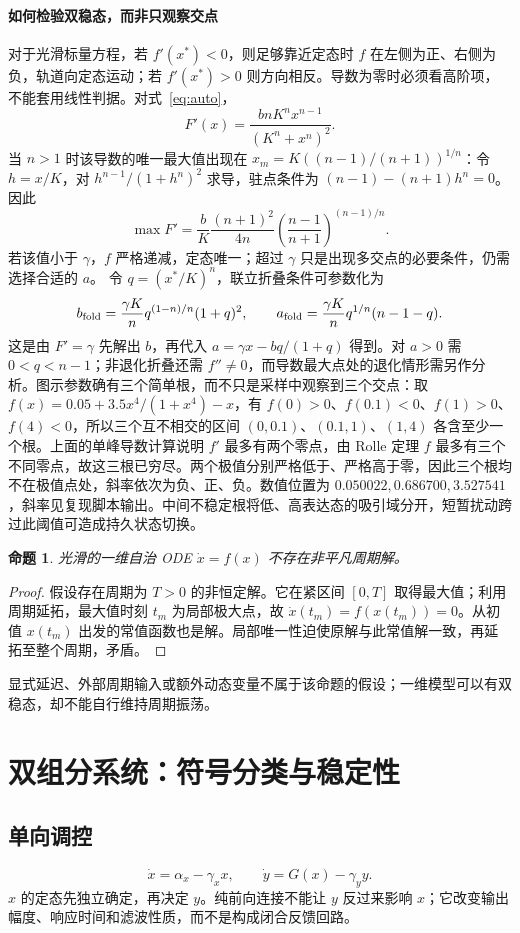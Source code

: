 \documentclass[11pt,a4paper,UTF8,fontset=fandol]{ctexart}
\newtheorem{proposition}{命题}[section]
\begin{document}
\paragraph{如何检验双稳态，而非只观察交点}
对于光滑标量方程，若 $f'(x^*)<0$，则足够靠近定态时 $f$ 在左侧为正、右侧为负，轨道向定态运动；若 $f'(x^*)>0$ 则方向相反。导数为零时必须看高阶项，不能套用线性判据。对式~\eqref{eq:auto}，
\[
F'(x)=\frac{bnK^nx^{n-1}}{(K^n+x^n)^2}.
\]
当 $n>1$ 时该导数的唯一最大值出现在 $x_m=K((n-1)/(n+1))^{1/n}$：令 $h=x/K$，对 $h^{n-1}/(1+h^n)^2$ 求导，驻点条件为 $(n-1)-(n+1)h^n=0$。因此
\[
\max F'=\frac bK\frac{(n+1)^2}{4n}
\left(\frac{n-1}{n+1}\right)^{(n-1)/n}.
\]
若该值小于 $\gamma$，$f$ 严格递减，定态唯一；超过 $\gamma$ 只是出现多交点的必要条件，仍需选择合适的 $a$。
令 $q=(x^*/K)^n$，联立折叠条件可参数化为
\[
b_{\rm fold}=\frac{\gamma K}{n}q^{(1-n)/n}(1+q)^2,\qquad
a_{\rm fold}=\frac{\gamma K}{n}q^{1/n}(n-1-q).
\]
这是由 $F'=\gamma$ 先解出 $b$，再代入 $a=\gamma x-bq/(1+q)$ 得到。对 $a>0$ 需 $0<q<n-1$；非退化折叠还需 $f''\ne0$，而导数最大点处的退化情形需另作分析。图示参数确有三个简单根，而不只是采样中观察到三个交点：取 $f(x)=0.05+3.5x^4/(1+x^4)-x$，有 $f(0)>0$、$f(0.1)<0$、$f(1)>0$、$f(4)<0$，所以三个互不相交的区间 $(0,0.1)$、$(0.1,1)$、$(1,4)$ 各含至少一个根。上面的单峰导数计算说明 $f'$ 最多有两个零点，由 Rolle 定理 $f$ 最多有三个不同零点，故这三根已穷尽。两个极值分别严格低于、严格高于零，因此三个根均不在极值点处，斜率依次为负、正、负。数值位置为 $0.050022,0.686700,3.527541$，斜率见复现脚本输出。中间不稳定根将低、高表达态的吸引域分开，短暂扰动跨过此阈值可造成持久状态切换。


\begin{proposition}光滑的一维自治 ODE $\dot x=f(x)$ 不存在非平凡周期解。\end{proposition}
\begin{proof}
假设存在周期为 $T>0$ 的非恒定解。它在紧区间 $[0,T]$ 取得最大值；利用周期延拓，最大值时刻 $t_m$ 为局部极大点，故 $\dot x(t_m)=f(x(t_m))=0$。从初值 $x(t_m)$ 出发的常值函数也是解。局部唯一性迫使原解与此常值解一致，再延拓至整个周期，矛盾。
\end{proof}
显式延迟、外部周期输入或额外动态变量不属于该命题的假设；一维模型可以有双稳态，却不能自行维持周期振荡。

\section{双组分系统：符号分类与稳定性}
\subsection{单向调控}
\begin{equation}\dot x=\alpha_x-\gamma_xx,\qquad\dot y=G(x)-\gamma_yy.\end{equation}
$x$ 的定态先独立确定，再决定 $y$。纯前向连接不能让 $y$ 反过来影响 $x$；它改变输出幅度、响应时间和滤波性质，而不是构成闭合反馈回路。
\end{document}

